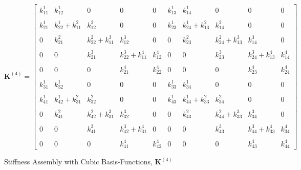 \begin{figure}
	\centering
	\begin{equation*}
		\mathbf{K}^{\left( 4 \right)} =
		\begin{bmatrix}
			k_{11}^{1} & k_{12}^{1}	& 0	& 0 & 0 & k_{13}^{1} & k_{14}^{1} & 0 & 0 & 0 \\ \\
			k_{21}^{1}&k_{22}^{1}+k_{11}^{2} & k_{12}^{2} & 0 & 0 & k_{23}^{1} & k_{24}^{1}+k_{13}^{2} & k_{14}^{2} & 0 & 0 \\ \\
			0&k_{21}^{2} & k_{22}^{2}+k_{11}^{3} & k_{12}^{3} & 0 & 0 & k_{23}^{2} & k_{24}^{2}+k_{13}^{3} & k_{14}^{3} & 0 \\ \\
			0 & 0 & k_{21}^{3} & k_{22}^{3}+k_{11}^{4} & k_{12}^{4} & 0 & 0 & k_{23}^{3} & k_{24}^{3}+k_{13}^{4} & k_{14}^{4} \\ \\
			0 & 0 & 0 & k_{21}^{4} & k_{22}^{4} & 0 & 0 & 0 & k_{23}^{4} & k_{24}^{4} \\ \\
			k_{31}^{1} & k_{32}^{1} & 0 & 0 & 0 & k_{33}^{1} & k_{34}^{1} & 0 & 0 & 0 \\ \\
			k_{41}^{1}&k_{42}^{1}+k_{31}^{2} & k_{32}^{2} & 0 & 0 & k_{43}^{1} & k_{44}^{1}+k_{33}^{2} & k_{34}^{2} & 0 & 0 \\ \\
			0&k_{41}^{2} & k_{42}^{2}+k_{31}^{3} & k_{32}^{3} & 0 & 0 & k_{43}^{2} & k_{44}^{2}+k_{33}^{3} & k_{34}^{3} & 0 \\ \\
			0 & 0 & k_{41}^{3} & k_{42}^{3} + k_{31}^{4} & 0 & 0 & 0 & k_{43}^{3} & k_{44}^{3} + k_{33}^{4} & k_{34}^{4} \\ \\
			0 & 0 & 0 & k_{41}^{4} & k_{42}^{4} & 0 & 0 & 0 & k_{43}^{4} & k_{44}^{4}
		\end{bmatrix}
	\end{equation*}
	\caption{Stiffness Assembly with Cubic Basis-Functions, $\mathbf{K}^{\left(4\right)}$ }	
	\label{fig:K_4_Cubic}
\end{figure}
%
